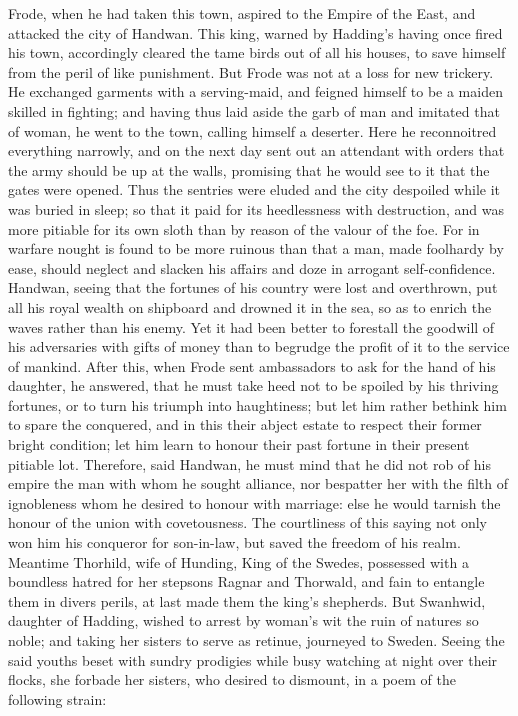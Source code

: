 \documentclass[10pt,a4paper]{report}
\begin{document}
Frode, when he had taken this town, aspired to the Empire of the East, and attacked the city of Handwan. This king, warned by Hadding's having once fired his town, accordingly cleared the tame birds out of all his houses, to save himself from the peril of like punishment. But Frode was not at a loss for new trickery. He exchanged garments with a serving-maid, and feigned himself to be a maiden skilled in fighting; and having thus laid aside the garb of man and imitated that of woman, he went to the town, calling himself a deserter. Here he reconnoitred everything narrowly, and on the next day sent out an attendant with orders that the army should be up at the walls, promising that he would see to it that the gates were opened. Thus the sentries were eluded and the city despoiled while it was buried in sleep; so that it paid for its heedlessness with destruction, and was more pitiable for its own sloth than by reason of the valour of the foe. For in warfare nought is found to be more ruinous than that a man, made foolhardy by ease, should neglect and slacken his affairs and doze in arrogant self-confidence.\\

Handwan, seeing that the fortunes of his country were lost and overthrown, put all his royal wealth on shipboard and drowned it in the sea, so as to enrich the waves rather than his enemy. Yet it had been better to forestall the goodwill of his adversaries with gifts of money than to begrudge the profit of it to the service of mankind. After this, when Frode sent ambassadors to ask for the hand of his daughter, he answered, that he must take heed not to be spoiled by his thriving fortunes, or to turn his triumph into haughtiness; but let him rather bethink him to spare the conquered, and in this their abject estate to respect their former bright condition; let him learn to honour their past fortune in their present pitiable lot. Therefore, said Handwan, he must mind that he did not rob of his empire the man with whom he sought alliance, nor bespatter her with the filth of ignobleness whom he desired to honour with marriage: else he would tarnish the honour of the union with covetousness. The courtliness of this saying not only won him his conqueror for son-in-law, but saved the freedom of his realm.\\

Meantime Thorhild, wife of Hunding, King of the Swedes, possessed with a boundless hatred for her stepsons Ragnar and Thorwald, and fain to entangle them in divers perils, at last made them the king's shepherds. But Swanhwid, daughter of Hadding, wished to arrest by woman's wit the ruin of natures so noble; and taking her sisters to serve as retinue, journeyed to Sweden. Seeing the said youths beset with sundry prodigies while busy watching at night over their flocks, she forbade her sisters, who desired to dismount, in a poem of the following strain:\\
\end{document}
